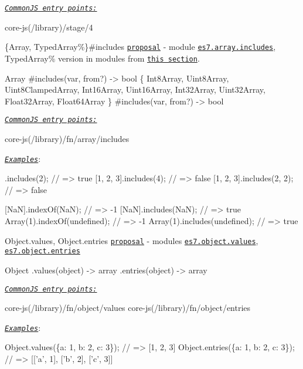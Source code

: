 \href{#commonjs}{\tt {\itshape Common\+JS entry points\+:}} 
\begin{DoxyCode}
core-js(/library)/stage/4
\end{DoxyCode}

\begin{DoxyItemize}
\item {\ttfamily \{Array, Typed\+Array\%\}\#includes} \href{https://github.com/tc39/Array.prototype.includes}{\tt proposal} -\/ module \href{https://github.com/zloirock/core-js/blob/v2.6.0/modules/es7.array.includes.js}{\tt {\ttfamily es7.\+array.\+includes}}, {\ttfamily Typed\+Array\%} version in modules from \href{#ecmascript-6-typed-arrays}{\tt this section}. 
\begin{DoxyCode}
Array
  #includes(var, from?) -> bool
\{
  Int8Array,
  Uint8Array,
  Uint8ClampedArray,
  Int16Array,
  Uint16Array,
  Int32Array,
  Uint32Array,
  Float32Array,
  Float64Array
\}
  #includes(var, from?) -> bool
\end{DoxyCode}
 \href{#commonjs}{\tt {\itshape Common\+JS entry points\+:}} 
\begin{DoxyCode}
core-js(/library)/fn/array/includes
\end{DoxyCode}
 \href{http://goo.gl/2Gq4ma}{\tt {\itshape Examples}}\+: 
\begin{DoxyCode}
[1, 2, 3].includes(2);        // => true
[1, 2, 3].includes(4);        // => false
[1, 2, 3].includes(2, 2);     // => false

[NaN].indexOf(NaN);           // => -1
[NaN].includes(NaN);          // => true
Array(1).indexOf(undefined);  // => -1
Array(1).includes(undefined); // => true
\end{DoxyCode}

\item {\ttfamily Object.\+values}, {\ttfamily Object.\+entries} \href{https://github.com/tc39/proposal-object-values-entries}{\tt proposal} -\/ modules \href{https://github.com/zloirock/core-js/blob/v2.6.0/modules/es7.object.values.js}{\tt {\ttfamily es7.\+object.\+values}}, \href{https://github.com/zloirock/core-js/blob/v2.6.0/modules/es7.object.entries.js}{\tt {\ttfamily es7.\+object.\+entries}} 
\begin{DoxyCode}
Object
  .values(object) -> array
  .entries(object) -> array
\end{DoxyCode}
 \href{#commonjs}{\tt {\itshape Common\+JS entry points\+:}} 
\begin{DoxyCode}
core-js(/library)/fn/object/values
core-js(/library)/fn/object/entries
\end{DoxyCode}
 \href{http://goo.gl/6kuGOn}{\tt {\itshape Examples}}\+: 
\begin{DoxyCode}
Object.values(\{a: 1, b: 2, c: 3\});  // => [1, 2, 3]
Object.entries(\{a: 1, b: 2, c: 3\}); // => [['a', 1], ['b', 2], ['c', 3]]


\end{DoxyCode}
\end{DoxyItemize}
